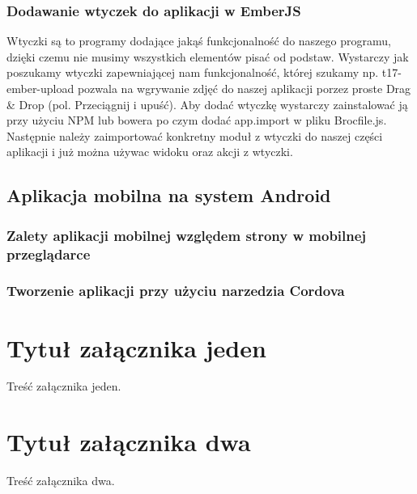 \documentclass[brudnopis]{xmgr}
\begin{document}
\subsection{Dodawanie wtyczek do aplikacji w EmberJS}
Wtyczki są to programy dodające jakąś funkcjonalność do naszego programu, dzięki czemu nie musimy wszystkich elementów pisać od podstaw. Wystarczy jak poszukamy wtyczki zapewniającej nam funkcjonalność, której szukamy np. t17-ember-upload pozwala na wgrywanie zdjęć do naszej aplikacji porzez proste Drag \& Drop (pol. Przeciągnij i upuść).  Aby dodać wtyczkę wystarczy zainstalować ją przy użyciu NPM lub bowera  po czym dodać app.import w pliku Brocfile.js. Następnie należy zaimportować konkretny moduł z wtyczki do naszej części aplikacji i już można używac widoku oraz akcji z wtyczki.

\section{Aplikacja mobilna  na system Android}
\subsection{Zalety aplikacji mobilnej względem strony w mobilnej przeglądarce}
\subsection{Tworzenie aplikacji przy użyciu narzedzia Cordova}

\summary

\appendix
\chapter{Tytuł załącznika jeden}

Treść załącznika jeden.
\chapter{Tytuł załącznika dwa}

Treść załącznika dwa.




\nocite {magiaUI}
\nocite {design}
\nocite {projektowanieUI}
\nocite {StiveKrug}
\nocite{DouglasCrockford}
\nocite {UIRails}
\nocite {modelingUI}
\nocite {rspecDoc}
\nocite {railsDoc}
\nocite {emberDoc}
\nocite{emberCLIDoc}
\nocite{emberRails}
\nocite{emberTutorial}
\nocite{emberIntro}

\listoftables

\listoffigures

\oswiadczenie
\end{document}
